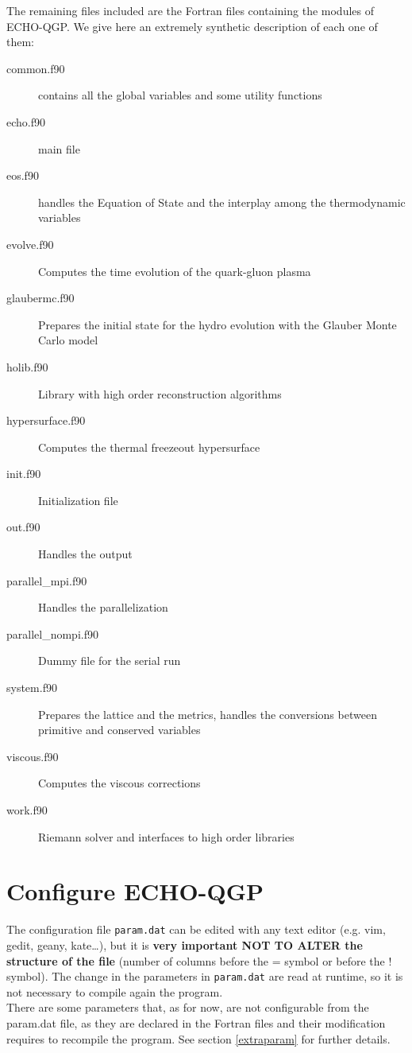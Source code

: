 The remaining files included are the Fortran files containing the modules of ECHO-QGP.
We give here an extremely synthetic description of each one of them:
\begin{description}
 \item[common.f90] contains all the global variables and some utility functions
 \item[echo.f90] main file
 \item[eos.f90] handles the Equation of State and the interplay among the thermodynamic variables
 \item[evolve.f90] Computes the time evolution of the quark-gluon plasma
 \item[glaubermc.f90]  Prepares the initial state for the hydro evolution with the Glauber Monte Carlo model 
 \item[holib.f90] Library with high order reconstruction algorithms
 \item[hypersurface.f90] Computes the thermal freezeout hypersurface
 \item[init.f90] Initialization file 
 \item[out.f90]  Handles the output
 \item[parallel\_mpi.f90] Handles the parallelization 
 \item[parallel\_nompi.f90] Dummy file for the serial run                                                                                                                                                                                                                                                 
 \item[system.f90]  Prepares the lattice and the metrics, handles the conversions between primitive and conserved variables
 \item[viscous.f90] Computes the viscous corrections                                                                                                                                                                                                                            
 \item[work.f90]  Riemann solver and interfaces to high order libraries    
\end{description}

\section{Configure ECHO-QGP}
The configuration file {\tt param.dat} can be edited with any text editor (e.g. vim, gedit, geany, kate\dots), but it is \textbf{very important NOT TO ALTER the structure of the file} (number of columns before the = symbol or before the ! symbol). The change in the parameters in {\tt param.dat} are read at runtime, so it is not necessary to compile again the program.\\
There are some parameters that, as for now, are not configurable from the param.dat file, as they are declared in the Fortran files and their modification requires to recompile the program. See section \ref{extraparam} for further details.

